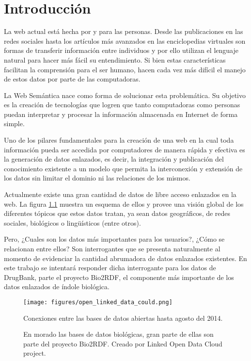 
\chapter{Introducción}

La web actual está hecha por y para las personas. Desde las publicaciones en las
redes sociales hasta los artículos más avanzados en las enciclopedias virtuales
son formas de transferir información entre individuos y por ello utilizan el
lenguaje natural para hacer más fácil su entendimiento. Si bien estas
características facilitan la comprensión para el ser humano, hacen cada
vez más difícil el manejo de estos datos por parte de las computadoras.

La Web Semántica nace como forma de solucionar esta problemática. Su objetivo es
la creación de tecnologías que logren que tanto computadoras como personas
puedan interpretar y procesar la información almacenada en Internet
de forma simple.

Uno de los pilares fundamentales para la creación de una web en la cual toda
información pueda ser accedida por computadores de manera rápida y efectiva es
la generación de datos enlazados, es decir, la integración y publicación del 
conocimiento existente a un modelo que permita la interconexión y extensión de
los datos sin limitar el dominio ni las relaciones de los mismos.

Actualmente existe una gran cantidad de datos de libre acceso enlazados en la
web. La figura \ref{fig:cloud} muestra un esquema de ellos y provee una visión
global de los diferentes tópicos que estos datos tratan, ya sean datos
geográficos, de redes sociales, biológicos o lingüísticos (entre otros).

Pero, ¿Cuales son los datos más importantes para los usuarios?, ¿Cómo se
relacionan entre ellos? Son interrogantes que se presenta naturalmente al
momento de evidenciar la cantidad abrumadora de datos enlazados existentes.
En este trabajo se intentará responder dicha interrogante para los datos de
DrugBank, parte el proyecto Bio2RDF, el componente más importante de los datos
enlazados de índole biológica.

\begin{figure}[ht]
  \centering
  \texttt{[image: figures/open\_linked\_data\_could.png]}
  \caption{Conexiones entre las bases de datos abiertas hasta agosto del 2014.}
  \vspace{-.2cm}
  \caption*{En morado las bases de datos biológicas, gran parte de ellas son
  parte del proyecto Bio2RDF. Creado por Linked Open Data Cloud project\cite{lod:cloud}.}
  \label{fig:cloud}
\end{figure}
~\vspace{-1cm}
